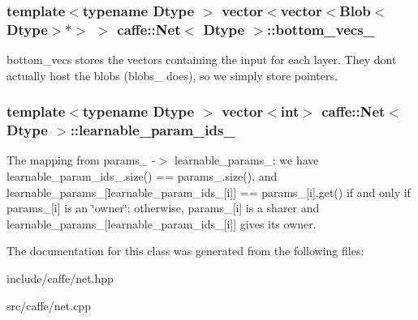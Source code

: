 \subsubsection[{\texorpdfstring{bottom\+\_\+vecs\+\_\+}{bottom_vecs_}}]{\setlength{\rightskip}{0pt plus 5cm}template$<$typename Dtype $>$ vector$<$vector$<${\bf Blob}$<$Dtype$>$$\ast$$>$ $>$ {\bf caffe\+::\+Net}$<$ Dtype $>$\+::bottom\+\_\+vecs\+\_\+\hspace{0.3cm}{\ttfamily [protected]}}\hypertarget{classcaffe_1_1Net_ac5bf2007047f749d9d111b0dfa220afc}{}\label{classcaffe_1_1Net_ac5bf2007047f749d9d111b0dfa220afc}
bottom\+\_\+vecs stores the vectors containing the input for each layer. They don\textquotesingle{}t actually host the blobs (blobs\+\_\+ does), so we simply store pointers. 
\subsubsection[{\texorpdfstring{learnable\+\_\+param\+\_\+ids\+\_\+}{learnable_param_ids_}}]{\setlength{\rightskip}{0pt plus 5cm}template$<$typename Dtype $>$ vector$<$int$>$ {\bf caffe\+::\+Net}$<$ Dtype $>$\+::learnable\+\_\+param\+\_\+ids\+\_\+\hspace{0.3cm}{\ttfamily [protected]}}\hypertarget{classcaffe_1_1Net_adf8dfb59e46d62c9333f322cea631bd8}{}\label{classcaffe_1_1Net_adf8dfb59e46d62c9333f322cea631bd8}
The mapping from params\+\_\+ -\/$>$ learnable\+\_\+params\+\_\+\+: we have learnable\+\_\+param\+\_\+ids\+\_\+.\+size() == params\+\_\+.\+size(), and learnable\+\_\+params\+\_\+\mbox{[}learnable\+\_\+param\+\_\+ids\+\_\+\mbox{[}i\mbox{]}\mbox{]} == params\+\_\+\mbox{[}i\mbox{]}.get() if and only if params\+\_\+\mbox{[}i\mbox{]} is an \char`\"{}owner\char`\"{}; otherwise, params\+\_\+\mbox{[}i\mbox{]} is a sharer and learnable\+\_\+params\+\_\+\mbox{[}learnable\+\_\+param\+\_\+ids\+\_\+\mbox{[}i\mbox{]}\mbox{]} gives its owner. 

The documentation for this class was generated from the following files\+:\begin{DoxyCompactItemize}
\item 
include/caffe/net.\+hpp\item 
src/caffe/net.\+cpp\end{DoxyCompactItemize}
